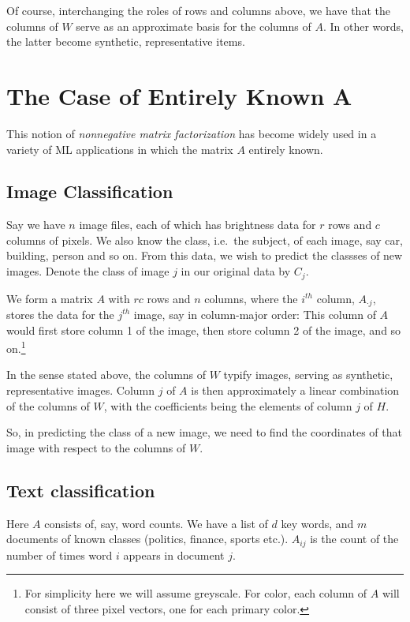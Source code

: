 Of course, interchanging the roles of rows and columns above, we have
that the columns of $W$ serve as an approximate basis for the columns of
$A$.  In other words, the latter become synthetic, representative items.

\section{The Case of Entirely Known A}

This notion of {\it nonnegative matrix factorization} has become widely
used in a variety of ML applications in which the matrix $A$ entirely
known. 

\subsection{Image Classification}

Say we have $n$ image files, each of which has brightness data for $r$
rows and $c$ columns of pixels.  We also know the class, i.e.\ the
subject, of each image, say car, building, person and so on.  From this
data, we wish to predict the classses of new images. Denote the class of
image $j$ in our original data by $C_j$.

We form a matrix $A$ with $rc$ rows and $n$ columns, where the $i^{th}$
column, $A_{\cdot j}$, stores the data for the $j^{th}$ image, say in
column-major order:  This column of $A$ would first store column 1 of
the image, then store column 2 of the image, and so on.\footnote{For
simplicity here we will assume greyscale.  For color, each column of $A$
will consist of three pixel vectors, one for each primary color.}

In the sense stated above, the columns of $W$ typify images, serving as
synthetic, representative images.  Column $j$ of $A$ is then
approximately a linear combination of the columns of $W$, with the
coefficients being the elements of column $j$ of $H$.

So, in predicting the class of a new image, we need to find the
coordinates of that image with respect to the columns of $W$.

\subsection{Text classification}

Here $A$ consists of, say, word counts. We have a list of $d$ key words,
and $m$ documents of known classes (politics, finance, sports etc.).
$A_{ij}$ is the count of the number of times word $i$ appears in
document $j$.

